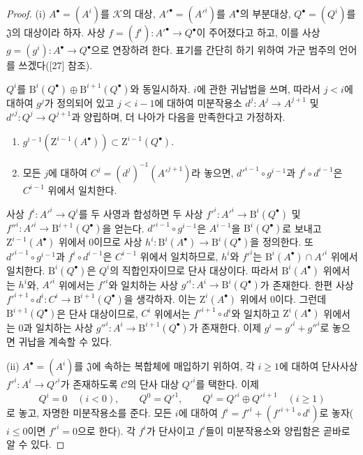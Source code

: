 \begin{proof}
\textup{(i)} $A^\bullet=(A^i)$를 $\mathcal K$의 대상,
$A'^\bullet=(A'^i)$를 $A^\bullet$의 부분대상,
$Q^\bullet=(Q^i)$를 $\mathfrak J$의 대상이라 하자. 사상
$f=(f^i):A'^\bullet\to Q^\bullet$이 주어졌다고 하고, 이를 사상
$g=(g^i):A^\bullet\to Q^\bullet$으로 연장하려 한다. 표기를
간단히 하기 위하여 가군 범주의 언어를 쓰겠다([27] 참조).

$Q^i$를
$\mathrm B^i(Q^\bullet)\oplus\mathrm B^{i+1}(Q^\bullet)$와
동일시하자. $i$에 관한 귀납법을 쓰며, 따라서 $j<i$에 대하여
$g^j$가 정의되어 있고 $j<i-1$에 대하여 미분작용소
$d^j:A^j\to A^{j+1}$ 및 $d'^j:Q^j\to Q^{j+1}$과 양립하며, 더 나아가
다음을 만족한다고 가정하자.
\begin{enumerate}
  \item[$1^\circ$] $g^{i-1}(\mathrm Z^{i-1}(A^\bullet))\subset
    \mathrm Z^{i-1}(Q^\bullet)$.
  \item[$2^\circ$] 모든 $j$에 대하여
    $C^j=(d^j)^{-1}(A'^{j+1})$라 놓으면,
    $d'^{i-1}\circ g^{i-1}$과 $f^i\circ d^{i-1}$은 $C^{i-1}$ 위에서
    일치한다.
\end{enumerate}
사상 $f^i:A'^i\to Q^i$를 두 사영과 합성하면 두 사상
$f'^i:A'^i\to\mathrm B^i(Q^\bullet)$ 및
$f''^i:A'^i\to\mathrm B^{i+1}(Q^\bullet)$을 얻는다.
$d'^{i-1}\circ g^{i-1}$은 $A^{i-1}$을 $\mathrm B^i(Q^\bullet)$로
보내고 $\mathrm Z^{i-1}(A^\bullet)$ 위에서 0이므로 사상
$h^i:\mathrm B^i(A^\bullet)\to\mathrm B^i(Q^\bullet)$을 정의한다.
또 $d'^{i-1}\circ g^{i-1}$과 $f^i\circ d^{i-1}$은 $C^{i-1}$ 위에서
일치하므로, $h^i$와 $f'^i$는
$\mathrm B^i(A^\bullet)\cap A'^i$ 위에서 일치한다.
$\mathrm B^i(Q^\bullet)$은 $Q^i$의 직합인자이므로 단사 대상이다.
따라서 $\mathrm B^i(A^\bullet)$ 위에서는 $h^i$와, $A'^i$ 위에서는
$f'^i$와 일치하는 사상
$g'^i:A^i\to\mathrm B^i(Q^\bullet)$가 존재한다. 한편 사상
$f'^{i+1}\circ d^i:C^i\to\mathrm B^{i+1}(Q^\bullet)$을 생각하자.
이는 $\mathrm Z^i(A^\bullet)$ 위에서 0이다. 그런데
$\mathrm B^{i+1}(Q^\bullet)$은 단사 대상이므로, $C^i$ 위에서는
$f'^{i+1}\circ d^i$와 일치하고 $\mathrm Z^i(A^\bullet)$ 위에서는
$0$과 일치하는 사상
$g''^i:A^i\to\mathrm B^{i+1}(Q^\bullet)$가 존재한다. 이제
$g^i=g'^i+g''^i$로 놓으면 귀납을 계속할 수 있다.

\textup{(ii)} $A^\bullet=(A^i)$를 $\mathfrak J$에 속하는 복합체에
매입하기 위하여, 각 $i\geq1$에 대하여 단사사상
$f'^i:A^i\to Q'^i$가 존재하도록 $\mathcal C$의 단사 대상 $Q'^i$를
택한다. 이제
\[
  Q^i=0\quad(i<0),\qquad Q^0=Q'^1,\qquad
  Q^i=Q'^i\oplus Q'^{i+1}\quad(i\geq1)
\]
로 놓고, 자명한 미분작용소를 준다. 모든 $i$에 대하여
$f^i=f'^i+(f'^{i+1}\circ d^i)$로 놓자($i\leq0$이면
$f'^i=0$으로 한다). 각 $f^i$가 단사이고 $f^i$들이 미분작용소와
양립함은 곧바로 알 수 있다.
\end{proof}

